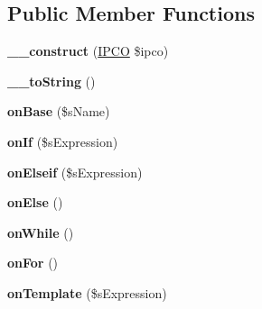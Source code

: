 \subsection*{Public Member Functions}
\begin{DoxyCompactItemize}
\item 
\hypertarget{class_i_p_c_o___builder_ace8f95d9c177f4a79364ebdcee1339af}{{\bfseries \-\_\-\-\_\-construct} (\hyperlink{class_i_p_c_o}{I\-P\-C\-O} \$ipco)}\label{class_i_p_c_o___builder_ace8f95d9c177f4a79364ebdcee1339af}

\item 
\hypertarget{class_i_p_c_o___builder_a4d9a4dc2039a73c5a4f781f131702ebd}{{\bfseries \-\_\-\-\_\-to\-String} ()}\label{class_i_p_c_o___builder_a4d9a4dc2039a73c5a4f781f131702ebd}

\item 
\hypertarget{class_i_p_c_o___builder_adc5dccb993352cc328069cfa6b8d8686}{{\bfseries on\-Base} (\$s\-Name)}\label{class_i_p_c_o___builder_adc5dccb993352cc328069cfa6b8d8686}

\item 
\hypertarget{class_i_p_c_o___builder_af36f259338b5fe40bb10253bfa10358e}{{\bfseries on\-If} (\$s\-Expression)}\label{class_i_p_c_o___builder_af36f259338b5fe40bb10253bfa10358e}

\item 
\hypertarget{class_i_p_c_o___builder_a871a40b39eb6283aeb38763c22b42f6a}{{\bfseries on\-Elseif} (\$s\-Expression)}\label{class_i_p_c_o___builder_a871a40b39eb6283aeb38763c22b42f6a}

\item 
\hypertarget{class_i_p_c_o___builder_ae0090458d5dc20374e8c90ff2b09aa22}{{\bfseries on\-Else} ()}\label{class_i_p_c_o___builder_ae0090458d5dc20374e8c90ff2b09aa22}

\item 
\hypertarget{class_i_p_c_o___builder_a8884066769b5abf1be41271a7c4bc890}{{\bfseries on\-While} ()}\label{class_i_p_c_o___builder_a8884066769b5abf1be41271a7c4bc890}

\item 
\hypertarget{class_i_p_c_o___builder_a03d854ad9a3e940735105c88f88ad273}{{\bfseries on\-For} ()}\label{class_i_p_c_o___builder_a03d854ad9a3e940735105c88f88ad273}

\item 
\hypertarget{class_i_p_c_o___builder_a7e9e7582a66a620067a24b60efe2a0a9}{{\bfseries on\-Template} (\$s\-Expression)}\label{class_i_p_c_o___builder_a7e9e7582a66a620067a24b60efe2a0a9}


\end{DoxyCompactItemize}

